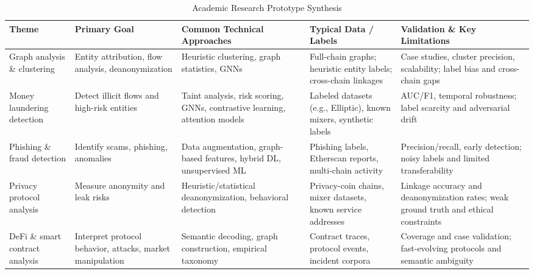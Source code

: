 \begin{table}[htbp]
\centering
\caption{Academic Research Prototype Synthesis}
\label{tab:prototype_synthesis}
\scriptsize
\begin{tabularx}{\textwidth}{XXXXX}
\hline
\textbf{Theme} & \textbf{Primary Goal} & \textbf{Common Technical Approaches} & \textbf{Typical Data / Labels} & \textbf{Validation \& Key Limitations} \\
\hline
Graph analysis \& clustering \cite{meiklejohn2013fistfulbitcoinscharacterizing,reid2013analysisanonymitybitcoin,ron2013quantitativeanalysisfull,androulaki2013evaluatinguserprivacy,wu2023tracerscalablegraphbased,lin2024crosschainabnormaltransaction} & Entity attribution, flow analysis, deanonymization & Heuristic clustering, graph statistics, GNNs & Full-chain graphs; heuristic entity labels; cross-chain linkages & Case studies, cluster precision, scalability; label bias and cross-chain gaps\\
Money laundering detection \cite{moser2013inquirymoneylaundering,moser2014riskscoringbitcoin,weber2019antimoneylaunderingbitcoin,ouyang2024bitcoinmoneylaundering,li2025globallocalgraphattention,lin2024denseflowspottingcryptocurrency} & Detect illicit flows and high-risk entities & Taint analysis, risk scoring, GNNs, contrastive learning, attention models & Labeled datasets (e.g., Elliptic), known mixers, synthetic labels & AUC/F1, temporal robustness; label scarcity and adversarial drift \\
Phishing \& fraud detection \cite{chen2020phishingscamdetection,chen2024ethereumphishingscam,liu2024detectionethereumphishing,pocher2023detectinganomalouscryptocurrency} & Identify scams, phishing, anomalies & Data augmentation, graph-based features, hybrid DL, unsupervised ML & Phishing labels, Etherscan reports, multi-chain activity & Precision/recall, early detection; noisy labels and limited transferability \\
Privacy protocol analysis \cite{kumar2017traceabilityanalysismoneros,kappos2018empiricalanalysisanonymity,wu2021detectingmixingservices} & Measure anonymity and leak risks & Heuristic/statistical deanonymization, behavioral detection & Privacy-coin chains, mixer datasets, known service addresses & Linkage accuracy and deanonymization rates; weak ground truth and ethical constraints \\
DeFi \cite{chen2020understandingethereumgraph,sun2025ethereumfrauddetection,qin2021attackingdefiecosystem,victor2021detectingquantifyingwash}  \& smart contract analysis & Interpret protocol behavior, attacks, market manipulation & Semantic decoding, graph construction, empirical taxonomy & Contract traces, protocol events, incident corpora & Coverage and case validation; fast-evolving protocols and semantic ambiguity \\

\end{tabularx}
\end{table}
